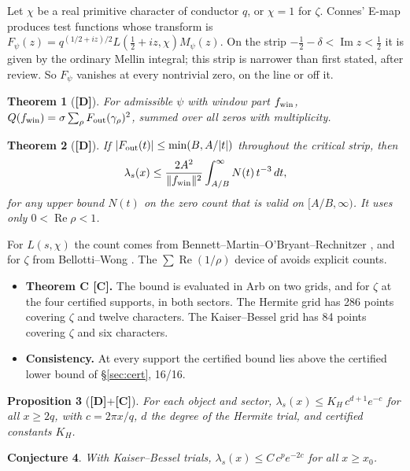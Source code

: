 \documentclass[11pt]{article}
\newtheorem{theorem}{Theorem}
\newtheorem{proposition}[theorem]{Proposition}
\newtheorem{conjecture}[theorem]{Conjecture}
\theoremstyle{remark}
\newcommand{\tagC}{\textbf{[C]}}
\newcommand{\tagD}{\textbf{[D]}}
\begin{document}
Let $\chi$ be a real primitive character of conductor $q$, or $\chi=1$ for $\zeta$. Connes' E-map produces test functions whose transform is $F_\psi(z)=q^{(1/2+iz)/2}L(\tfrac12+iz,\chi)M_\psi(z)$. On the strip $-\tfrac12-\delta<\operatorname{Im}z<\tfrac12$ it is given by the ordinary Mellin integral; this strip is narrower than first stated, after review. So $F_\psi$ vanishes at every nontrivial zero, on the line or off it.

\begin{theorem}[\tagD]\label{thm:emap}
For admissible $\psi$ with window part $f_{\rm win}$, $Q(f_{\rm win})=\sigma\sum_\rho F_{\rm out}(\gamma_\rho)^2$, summed over all zeros with multiplicity.
\end{theorem}

\begin{theorem}[\tagD]\label{thm:bound}
If $|F_{\rm out}(t)|\le\min(B,A/|t|)$ throughout the critical strip, then
\[
\lambda_s(x)\le\frac{2A^2}{\|f_{\rm win}\|^2}\int_{A/B}^\infty N(t)\,t^{-3}\,dt,
\]
for any upper bound $N(t)$ on the zero count that is valid on $[A/B,\infty)$. It uses only $0<\operatorname{Re}\rho<1$.
\end{theorem}

For $L(s,\chi)$ the count comes from Bennett--Martin--O'Bryant--Rechnitzer \cite{bmor}, and for $\zeta$ from Bellotti--Wong \cite{bw}. The $\sum\operatorname{Re}(1/\rho)$ device of \cite{mori26a} avoids explicit counts.
\begin{itemize}
\item \textbf{Theorem C \tagC.} The bound is evaluated in Arb on two grids, and for $\zeta$ at the four certified supports, in both sectors. The Hermite grid has 286 points covering $\zeta$ and twelve characters. The Kaiser--Bessel grid has 84 points covering $\zeta$ and six characters.
\item \textbf{Consistency.} At every support the certified bound lies above the certified lower bound of \S\ref{sec:cert}, 16/16.
\end{itemize}

\begin{proposition}[\tagD+\tagC]
For each object and sector, $\lambda_s(x)\le K_H\,c^{d+1}e^{-c}$ for all $x\ge2q$, with $c=2\pi x/q$, $d$ the degree of the Hermite trial, and certified constants $K_H$.
\end{proposition}

\begin{conjecture}
With Kaiser--Bessel trials, $\lambda_s(x)\le C\,c^p e^{-2c}$ for all $x\ge x_0$.
\end{conjecture}
\end{document}
